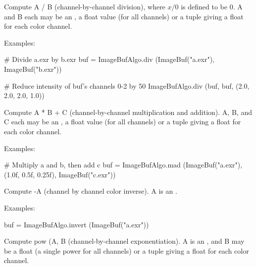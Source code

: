 Compute {\cf A / B} (channel-by-channel division), where $x/0$
is defined to be $0$.  {\cf A} and {\cf B} each may
be an \ImageBuf, a {\cf float} value (for all channels) or a tuple giving a
{\cf float} for each color channel.

\smallskip
\noindent Examples:
\begin{code}
    # Divide a.exr by b.exr
    buf = ImageBufAlgo.div (ImageBuf("a.exr"), ImageBuf("b.exr"))

    # Reduce intensity of buf's channels 0-2 by 50%
    ImageBufAlgo.div (buf, buf, (2.0, 2.0, 2.0, 1.0))
\end{code}
\apiend


 

Compute {\cf A * B + C} (channel-by-channel multiplication
and addition).  {\cf A}, {\cf B}, and {\cf C} each may
be an \ImageBuf, a {\cf float} value (for all channels) or a tuple giving a
{\cf float} for each color channel.

\smallskip
\noindent Examples:
\begin{code}
    # Multiply a and b, then add c
    buf = ImageBufAlgo.mad (ImageBuf("a.exr"),
                            (1.0f, 0.5f, 0.25f), ImageBuf("c.exr"))
\end{code}
\apiend



 

Compute {-A} (channel by channel color inverse).
{\cf A} is an \ImageBuf.

\smallskip
\noindent Examples:
\begin{code}
    buf = ImageBufAlgo.invert (ImageBuf("a.exr"))
\end{code}
\apiend


 

Compute {\cf pow (A, B} (channel-by-channel exponentiation).
{\cf A} is an \ImageBuf, and {\cf B} may be a {\cf float} (a single power
for all channels) or a tuple giving a {\cf float} for each color channel.

